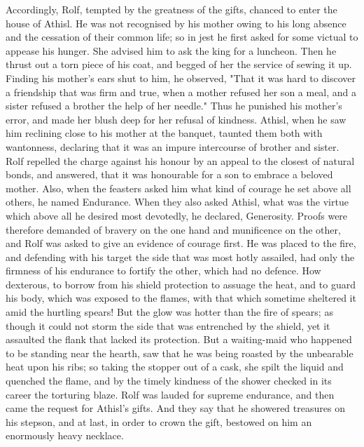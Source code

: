 \documentclass[10pt,a4paper]{report}
\begin{document}
Accordingly, Rolf, tempted by the greatness of the gifts, chanced to enter the house of Athisl. He was not recognised by his mother owing to his long absence and the cessation of their common life; so in jest he first asked for some victual to appease his hunger. She advised him to ask the king for a luncheon. Then he thrust out a torn piece of his coat, and begged of her the service of sewing it up. Finding his mother's ears shut to him, he observed, "That it was hard to discover a friendship that was firm and true, when a mother refused her son a meal, and a sister refused a brother the help of her needle." Thus he punished his mother's error, and made her blush deep for her refusal of kindness. Athisl, when he saw him reclining close to his mother at the banquet, taunted them both with wantonness, declaring that it was an impure intercourse of brother and sister. Rolf repelled the charge against his honour by an appeal to the closest of natural bonds, and answered, that it was honourable for a son to embrace a beloved mother. Also, when the feasters asked him what kind of courage he set above all others, he named Endurance. When they also asked Athisl, what was the virtue which above all he desired most devotedly, he declared, Generosity. Proofs were therefore demanded of bravery on the one hand and munificence on the other, and Rolf was asked to give an evidence of courage first. He was placed to the fire, and defending with his target the side that was most hotly assailed, had only the firmness of his endurance to fortify the other, which had no defence. How dexterous, to borrow from his shield protection to assuage the heat, and to guard his body, which was exposed to the flames, with that which sometime sheltered it amid the hurtling spears! But the glow was hotter than the fire of spears; as though it could not storm the side that was entrenched by the shield, yet it assaulted the flank that lacked its protection. But a waiting-maid who happened to be standing near the hearth, saw that he was being roasted by the unbearable heat upon his ribs; so taking the stopper out of a cask, she spilt the liquid and quenched the flame, and by the timely kindness of the shower checked in its career the torturing blaze. Rolf was lauded for supreme endurance, and then came the request for Athisl's gifts. And they say that he showered treasures on his stepson, and at last, in order to crown the gift, bestowed on him an enormously heavy necklace.\\
\end{document}
